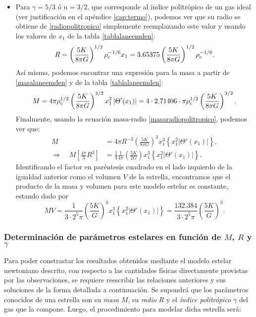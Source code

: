\begin{itemize}
\item Para $\gamma=5/3$ ó $n=3/2$, que corresponde al índice politrópico de un gas ideal (ver justificación en el apéndice \ref{cap:termo}), podemos ver que su radio se obtiene de \eqref{radiopolitropico} simplemente reemplazando este valor y usando los valores de $x_1$ de la tabla \ref{tablalaneemden}:
\begin{equation}\label{radio5/3}
 R=\left(\frac{5K}{8\pi G}\right)^{1/2}\rho_{\rm c}^{-1/6}x_1=3.65375\left(\frac{5K}{8\pi G}\right)^{1/2}\rho_{\rm c}^{-1/6}.
\end{equation}
Así mismo, podemos encontrar una expresión para la masa a partir de \eqref{masalaneemden} y de la tabla \ref{tablalaneemden}:
\begin{equation}\label{masa5/3}
 M=4\pi\rho_{\rm c}^{1/2}\left(\frac{5K}{8\pi G}\right)^{3/2}x_1^2\left|\Theta'(x_1)\right|=4\cdot2.71406\cdot\pi\rho_{\rm c}^{1/2}\left(\frac{5K}{8\pi G}\right)^{3/2}.
\end{equation}
Finalmente, usando la ecuación masa-radio \eqref{masaradiopolitropico}, podemos ver que:
\begin{align}
M&=4\pi R^{-3}\left(\frac{5K}{8\pi G}\right)^3x_1^3\left\{x_1^2\left|\Theta'(x_1)\right|\right\}\label{masaradio5/3},\\
\Rightarrow\quad M\left[\frac{4\pi}{3}R^3\right]&=\frac{1}{3}\frac{1}{4\pi}\left(\frac{5K}{2G}\right)x_1^3\left\{x_1^2\left|\Theta'(x_1)\right|\right\}.
\end{align}
Identificando el factor en paréntesis cuadrado en el lado izquierdo de la igualdad anterior como el volumen $V$ de la estrella, encontramos que el producto de la masa y volumen para este modelo estelar es constante, estando dado por
\begin{equation}
 MV=\frac{1}{3\cdot 2^5\pi}\left(\frac{5K}{G}\right)^3 x_1^ 3\left\{x_1^2\left|\Theta'(x_1)\right|\right\}=\frac{132.384}{3\cdot 2^5\pi}\left(\frac{5K}{G}\right)^3\label{masavolumen5/3}.
\end{equation}

\end{itemize}


\subsubsection{Determinación de parámetros estelares en función de \texorpdfstring{$M$}{M}, \texorpdfstring{$R$}{R} y \texorpdfstring{$\gamma$}{gamma}}

Para poder constrastar los resultados obtenidos mediante el modelo estelar newtoniano descrito, con respecto a las cantidades físicas directamente provistas por las observaciones, se requiere reescribir las relaciones anteriores y sus soluciones de la forma detallada a continuación. Se supondrá que los parámetros conocidos de una estrella son su \emph{masa} $M$, su \emph{radio} $R$ y el \emph{índice politrópico} $\gamma$ del gas que la compone. Luego, el procedimiento para modelar dicha estrella será:

